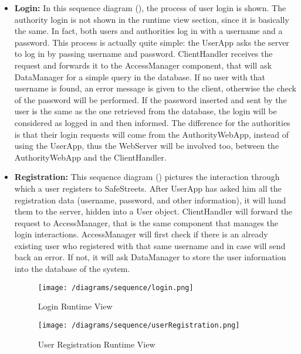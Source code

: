 			\begin{itemize}
				\item \textbf{Login:} In this sequence diagram (), the process of user login is shown. The authority login is not shown in the runtime view section, since it is basically the same. In fact, both users and authorities log in with a username and a password. This process is actually quite simple: the UserApp asks the server to log in by passing username and password. ClientHandler receives the request and forwards it to the AccessManager component, that will ask DataManager for a simple query in the database. If no user with that username is found, an error message is given to the client, otherwise the check of the password will be performed. If the password inserted and sent by the user is the same as the one retrieved from the database, the login will be considered as logged in and then informed.
				The difference for the authorities is that their login requests will come from  the AuthorityWebApp, instead of using the UserApp, thus the WebServer will be involved too, between the AuthorityWebApp and the ClientHandler.
	
				\item \textbf{Registration:} This sequence diagram () pictures the interaction through which a user registers to SafeStreets. After UserApp has asked him all the registration data (username, password, and other information), it will hand them to the server, hidden into a User object. ClientHandler will forward the request to AccessManager, that is the same component that manages the login interactions. AccessManager will first check if there is an already existing user who registered with that same username and in case will send back an error. If not, it will ask DataManager to store the user information into the database of the system.
				
				\newpage
				
				\begin{figure}[h!]
					\centering
					\texttt{[image: /diagrams/sequence/login.png]}
					\caption{\label{fig:loginRuntime} Login Runtime View}
				\end{figure}
			
				\vspace{2cm}
				
				\begin{figure}[h!]
					\centering
					\texttt{[image: /diagrams/sequence/userRegistration.png]}
					\caption{\label{fig:userRegistrationRuntime} User Registration Runtime View}
				\end{figure}
			

\end{itemize}

